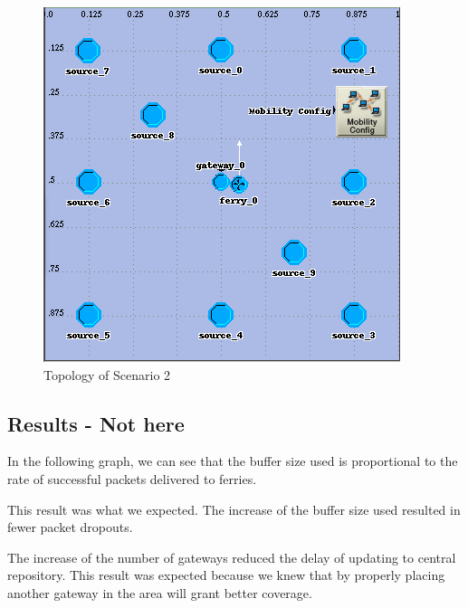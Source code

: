 \begin{figure}[h]
    \centering
    \includegraphics[width=.5\textwidth]{images/scenario2-top}
    \caption{Topology of Scenario 2}
    \label{fig:scenario2}
\end{figure}


\subsection{Results - Not here}

In the following graph, we can see that the buffer size used is proportional to the rate of successful packets delivered to ferries.


This result was what we expected.  
The increase of the buffer size used resulted in fewer packet dropouts.



The increase of the number of gateways reduced the delay of updating to central repository.  
This result was expected because we knew that by properly placing another gateway in the area will grant better coverage.  
